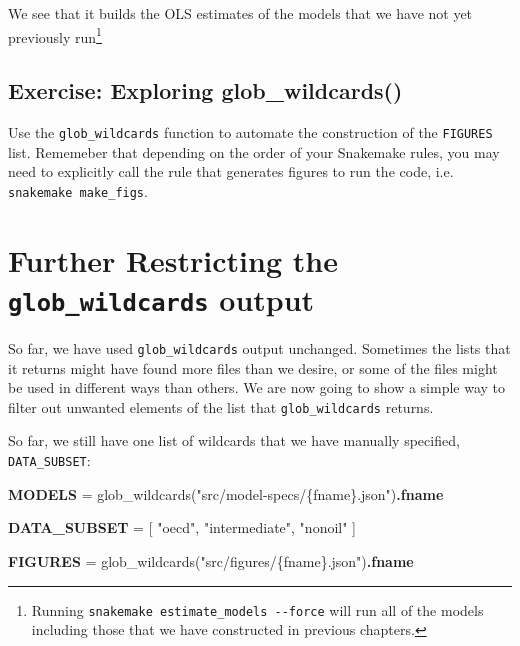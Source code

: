 \documentclass[]{book}
\newenvironment{Shaded}{\begin{snugshade}}{\end{snugshade}}
\newcommand{\KeywordTok}[1]{\textcolor[rgb]{0.13,0.29,0.53}{\textbf{{#1}}}}
\newcommand{\StringTok}[1]{\textcolor[rgb]{0.31,0.60,0.02}{{#1}}}
\newcommand{\NormalTok}[1]{{#1}}
\let\rmarkdownfootnote\footnote%
\def\footnote{\protect\rmarkdownfootnote}
\theoremstyle{definition}
\theoremstyle{definition}
\theoremstyle{definition}
\theoremstyle{remark}
\begin{document}
We see that it builds the OLS estimates of the models that we have not
yet previously run\footnote{Running
  \texttt{snakemake\ estimate\_models\ -\/-force} will run all of the
  models including those that we have constructed in previous chapters.}

\subsection*{Exercise: Exploring
glob\_wildcards()}\label{exercise-exploring-glob_wildcards}

Use the \texttt{glob\_wildcards} function to automate the construction
of the \texttt{FIGURES} list. Rememeber that depending on the order of
your Snakemake rules, you may need to explicitly call the rule that
generates figures to run the code, i.e. \texttt{snakemake\ make\_figs}.

\section{\texorpdfstring{Further Restricting the
\texttt{glob\_wildcards}
output}{Further Restricting the glob\_wildcards output}}\label{further-restricting-the-glob_wildcards-output}

So far, we have used \texttt{glob\_wildcards} output unchanged.
Sometimes the lists that it returns might have found more files than we
desire, or some of the files might be used in different ways than
others. We are now going to show a simple way to filter out unwanted
elements of the list that \texttt{glob\_wildcards} returns.

So far, we still have one list of wildcards that we have manually
specified, \texttt{DATA\_SUBSET}:

\begin{Shaded}
\begin{Highlighting}[]
\KeywordTok{MODELS} \NormalTok{= glob_wildcards(}\StringTok{"src/model-specs/\{fname\}.json"}\NormalTok{)}\KeywordTok{.fname}

\KeywordTok{DATA_SUBSET} \NormalTok{= [}
                \StringTok{"oecd"}\NormalTok{,}
                \StringTok{"intermediate"}\NormalTok{,}
                \StringTok{"nonoil"}
                \NormalTok{]}

\KeywordTok{FIGURES} \NormalTok{= glob_wildcards(}\StringTok{"src/figures/\{fname\}.json"}\NormalTok{)}\KeywordTok{.fname}
\end{Highlighting}
\end{Shaded}
\end{document}
